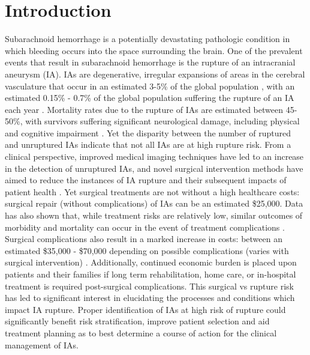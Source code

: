 \cleartooddpage[\thispagestyle{empty}]
\chapter{Introduction}\label{CHAPTER1}


Subarachnoid hemorrhage is a potentially devastating pathologic condition in which bleeding occurs into the space surrounding the brain. One of the prevalent events that result in subarachnoid hemorrhage is the rupture of an intracranial aneurysm (IA). IAs are degenerative, irregular expansions of areas in the cerebral vasculature that occur in an estimated 3-5\% of the global population \cite{revilla2018prevalence,hackenberg2018unruptured,villablanca2013natural}, with an estimated 0.15\% - 0.7\% of the global population suffering the rupture of an IA each year \cite{hughes2018estimating}. Mortality rates due to the rupture of IAs are estimated between 45-50\%, with survivors suffering significant neurological damage, including physical and cognitive impairment \cite{LONGO2017632,villablanca2013natural}. Yet the disparity between the number of ruptured and unruptured IAs indicate that not all IAs are at high rupture risk. 
	From a clinical perspective, improved medical imaging techniques have led to an increase in the detection of unruptured IAs, and novel surgical intervention methods have aimed to reduce the instances of IA rupture and their subsequent impacts of patient health \cite{molyneux2002international,komotar2008guidelines}. Yet surgical treatments are not without a high healthcare costs: surgical repair (without complications) of IAs can be an estimated \$25,000. Data has also shown that, while treatment risks are relatively low, similar outcomes of morbidity and mortality can occur in the event of treatment complications \cite{mascitelli2015predictors,liu2016recanalization,chalouhi2015safety}. Surgical complications also result in a marked increase in costs: between an estimated \$35,000 - \$70,000 depending on possible complications (varies with surgical intervention) \cite{brinjikji2012hospitalization}. Additionally, continued economic burden is placed upon patients and their families if long term rehabilitation, home care, or in-hospital treatment is required post-surgical complications. 
This surgical vs rupture risk has led to significant interest in elucidating the processes and conditions which impact IA rupture. Proper identification of IAs at high risk of rupture could significantly benefit risk stratification, improve patient selection and aid treatment planning as to best determine a course of action for the clinical management of IAs.


